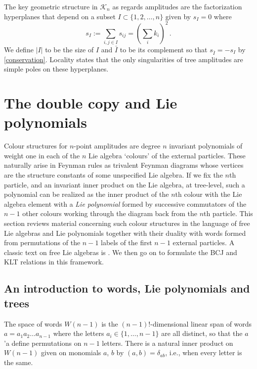 \documentclass[11pt]{article}
\newcommand{\cK}{\mathcal{K}}
\newcommand{\1}{{\rm 1\hskip-0.25em I}}
\begin{document}
The key geometric structure in $\cK_n$ as regards amplitudes are the factorization hyperplanes that depend on a subset $I\subset \{1,2,\ldots,n\}$ given by $s_I=0$ where\begin{equation}
s_I:=\sum_{i,j\in I} s_{ij}=\left(\sum_i k_i\right)^2\, .
\end{equation}
We define $|I|$ to be the size of $I$ and $\bar I$ to be its complement so that $s_{\bar I}=-s_I$ by \eqref{conservation}. Locality states that the only singularities of tree amplitudes are simple poles on these hyperplanes.



\section{The double copy and Lie polynomials}

Colour structures for $n$-point  amplitudes are degree $n$ invariant polynomials of weight one in each of the $n$ Lie algebra `colours' of the external particles.  These  naturally arise in Feynman rules as trivalent Feynman diagrams whose vertices are the structure constants of some unspecified Lie algebra.  If we fix the $n$th particle, and an invariant inner product on the Lie algebra, at tree-level, such a polynomial can be realized as the inner product of the $n$th colour with the Lie algebra element with a \emph{Lie polynomial} formed by successive commutators of the $n-1$ other colours working through the diagram back from the $n$th particle. This section reviews material concerning such colour structures in the language of free Lie algebras and Lie polynomials  together with their duality with words formed from permutations of the $n-1$ labels of the first $n-1$ external particles. A classic text on free Lie algebras is \cite{Reutenauer}. We then go on to formulate the BCJ and KLT relations in this framework.

\subsection{An introduction to words, Lie polynomials and trees}

The space of words $W(n-1)$ is the $(n-1)!$-dimensional linear span of  words $a=a_1a_2\ldots a_{n-1}$ where the letters $a_i\in \{1,\ldots,n-1\}$ are all distinct, so that the $a$'a define permutations on $n-1$ letters.  There is a natural inner product on $W(n-1)$ given  on monomials $a$, $b$ by $(a,b)=\delta_{ab}$, i.e., when every letter is the same. 
\end{document}
